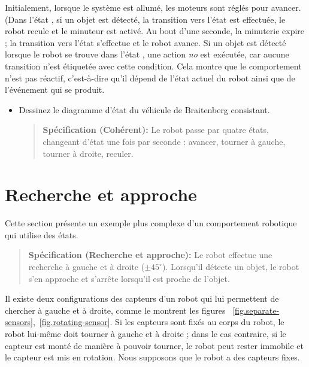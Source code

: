 Initialement, lorsque le système est allumé, les moteurs sont réglés pour avancer. (Dans l'état , si un objet est détecté, la transition vers l'état  est effectuée, le robot recule et le minuteur est activé. Au bout d'une seconde, la minuterie expire ; la transition vers l'état  s'effectue et le robot avance. Si un objet est détecté lorsque le robot se trouve dans l'état , une action \emph{no} est exécutée, car aucune transition n'est étiquetée avec cette condition. Cela montre que le comportement n'est pas réactif, c'est-à-dire qu'il dépend de l'état actuel du robot ainsi que de l'événement qui se produit.

\begin{framed}
\begin{itemize}
\item Dessinez le diagramme d'état du véhicule de Braitenberg consistant.
\begin{quote}
\normalsize\noindent\textbf{Spécification (Cohérent):} Le robot passe par quatre états, changeant d'état une fois par seconde : avancer, tourner à gauche, tourner à droite, reculer.
\end{quote}
\end{itemize}
\end{framed}

\section{Recherche et approche}\label{s.search-and-approach}

Cette section présente un exemple plus complexe d'un comportement robotique qui utilise des états.

\begin{quote}
\normalsize\noindent\textbf{Spécification (Recherche et approche):} Le robot effectue une recherche à gauche et à droite ($\pm 45^\circ$). Lorsqu'il détecte un objet, le robot s'en approche et s'arrête lorsqu'il est proche de l'objet.
\end{quote}

Il existe deux configurations des capteurs d'un robot qui lui permettent de chercher à gauche et à droite, comme le montrent les figures ~\ref{fig.separate-sensors},~\ref{fig.rotating-sensor}. Si les capteurs sont fixés au corps du robot, le robot lui-même doit tourner à gauche et à droite ; dans le cas contraire, si le capteur est monté de manière à pouvoir tourner, le robot peut rester immobile et le capteur est mis en rotation. Nous supposons que le robot a des capteurs fixes.

